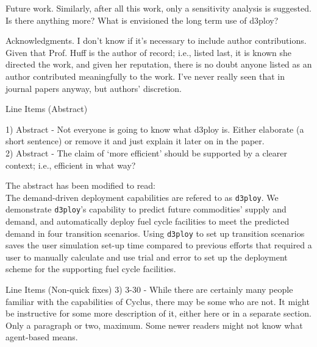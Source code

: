 \documentclass[answers,11pt]{exam}
\newcommand{\deploy}{\texttt{d3ploy}\xspace}%
\begin{document}
\begin{questions}
\begin{solution}
\end{solution}

\question Future work. Similarly, after all this work, only a sensitivity analysis is suggested. Is there anything
more? What is envisioned the long term use of d3ploy?

\begin{solution}
\end{solution}

\question Acknowledgments. I don’t know if it’s necessary to include author contributions. Given that Prof. Huff
is the author of record; i.e., listed last, it is known she directed the work, and given her reputation, there
is no doubt anyone listed as an author contributed meaningfully to the work. I’ve never really seen that
in journal papers anyway, but authors’ discretion.

\begin{solution}
\end{solution}

\question Line Items (Abstract)

1) Abstract - Not everyone is going to know what d3ploy is. Either elaborate (a short sentence) or
remove it and just explain it later on in the paper. \\
2) Abstract - The claim of ‘more efficient’ should be supported by a clearer context; i.e., efficient in
what way?


\begin{solution}
The abstract has been modified to read: \\
The demand-driven deployment capabilities are refered to as \deploy. 
We demonstrate \deploy's capability to predict future commodities' 
supply and demand, and automatically deploy fuel 
cycle facilities to meet the predicted demand in four transition scenarios. 
Using \deploy to set up transition scenarios saves the user 
simulation set-up time compared to previous efforts that
required a user to manually calculate and use trial and error 
to set up the deployment scheme for the supporting fuel cycle 
facilities. 
\end{solution}

\question Line Items (Non-quick fixes)
3) 3-30 - While there are certainly many people familiar with the capabilities of Cyclus, there may be
some who are not. It might be instructive for some more description of it, either here or in a separate
section. Only a paragraph or two, maximum. Some newer readers might not know what agent-based
means.


\end{questions}
\end{document}
